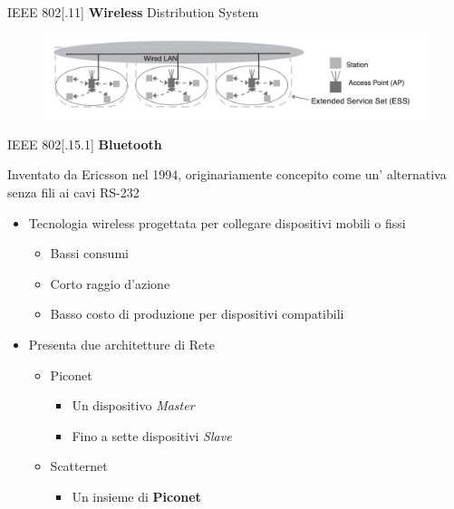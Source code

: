 	\begin{frame}{IEEE 802[.11]}
	\textbf{Wireless}
	\newline
	Distribution System
		\begin{figure}[h] 
			\includegraphics[scale=0.3,cfbox=blue_slides 1pt 0pt]{imgs/ds.png} %
		\end{figure}
\end{frame}
	
\begin{frame}{IEEE 802[.15.1]}
	\textbf{Bluetooth}
	\begin{block}{}
		Inventato da Ericsson nel 1994, originariamente concepito come un' alternativa senza fili ai cavi RS-232
	\end{block}
	\pause
	\begin{itemize}[<+- | alert@+>]
		\item Tecnologia wireless progettata per collegare dispositivi mobili o fissi
			\begin{itemize}[<+- | alert@+>]
				\item Bassi consumi
				\item Corto raggio d'azione
				\item Basso costo di produzione per dispositivi compatibili
			\end{itemize}
			\item Presenta due architetture di Rete
			\begin{itemize}[<+- | alert@+>]
				\item Piconet
				\begin{itemize}
					\item Un dispositivo \textit{Master}
					\item Fino a sette dispositivi \textit{Slave}
				\end{itemize}
				\item Scatternet
				\begin{itemize}[<+- | alert@+>]
					\item Un insieme di \textbf{Piconet}
				\end{itemize}
			\end{itemize}
	\end{itemize}		
\end{frame}

